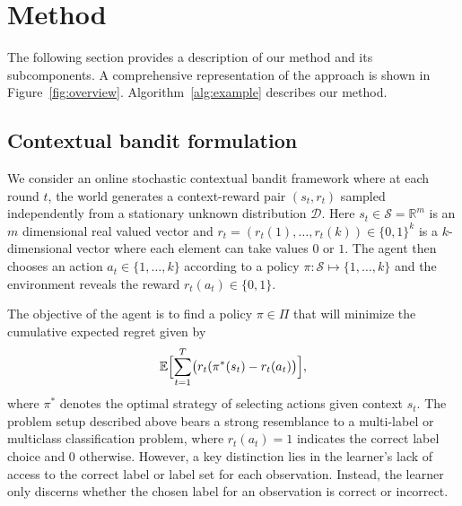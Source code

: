 \section{Method}
The following section provides a description of our method and its subcomponents. A comprehensive representation of the approach is shown in Figure~\ref{fig:overview}. Algorithm~\ref{alg:example} describes our method.

\subsection{Contextual bandit formulation}
We consider an online stochastic contextual bandit framework where at each round $t$, the world generates a context-reward pair $(s_t,r_t)$ sampled independently from a stationary unknown distribution $\mathcal D$. Here $s_t\in \mathcal S= \mathbb{R}^m$ is an $m$ dimensional real valued vector and $r_t=(r_t(1),\dots,r_t(k))\in \{0,1\}^k$ is a $k$-dimensional vector where each element can take values $0$ or $1$. The agent then chooses an action $a_t\in\{1,\dots,k\}$ %
according to a policy $\pi:\mathcal{S}\mapsto \{1,\dots,k\}$ and the environment reveals the reward $r_t(a_t)\in\{0,1\}$. 


The objective of the agent is to find a policy $\pi\in \Pi$ that will minimize the cumulative expected regret given by 
\begin{equation}
    \mathbb{E}\Bigl[\sum_{t=1}^T\bigl(r_t(\pi^*(s_t)-r_t(a_t)\bigr)\Bigr],
\end{equation}
where $\pi^*$ denotes the optimal strategy of selecting actions given context $s_t$.
The problem setup described above bears a strong resemblance to a multi-label or multiclass classification problem, where $r_t(a_t)=1$ indicates the correct label choice and $0$ otherwise. However, a key distinction lies in the learner's lack of access to the correct label or label set for each observation. Instead, the learner only discerns whether the chosen label for an observation is correct or incorrect. 

